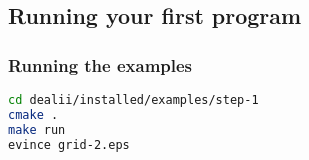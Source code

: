 \subsection{Running your first program}

\begin{frame}[fragile]
  \frametitle{Running the examples}
\begin{lstlisting}[language=bash,basicstyle=\ttfamily,keywordstyle=\ttfamily]
cd dealii/installed/examples/step-1
cmake .
make run
evince grid-2.eps
\end{lstlisting}
\end{frame}


